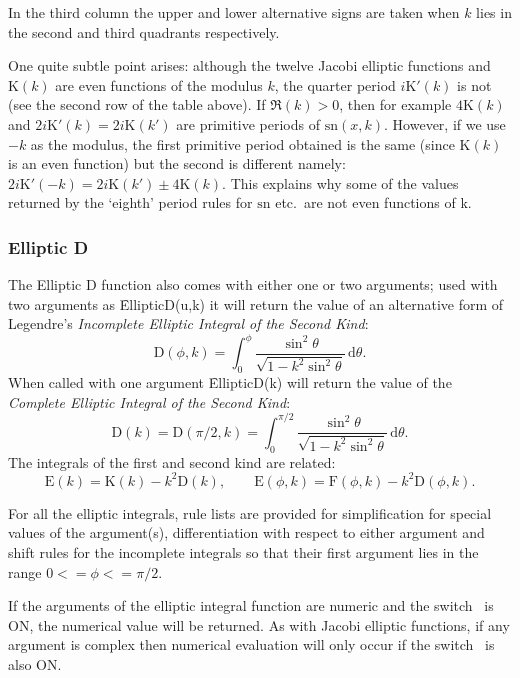 In the third column the upper and lower alternative signs are taken when
$k$ lies in the second and third quadrants respectively.

One quite subtle point arises: although the twelve Jacobi elliptic functions
and $\mathrm{K}(k)$ are even functions of the modulus $k$, the quarter period
$i\mathrm{K}'(k)$ is not (see the second row of the table above).
If $\Re(k)>0$, then for example
$4\mathrm{K}(k)$ and  $2i\mathrm{K}'(k)=2i\mathrm{K}(k')$ are
primitive periods of $\mathrm{sn}(x,k)$. However, if we use $-k$ as the modulus,
the first primitive period obtained is the same (since $\mathrm{K}(k)$ is an
even function) but the second is different namely:
$2i\mathrm{K}'(-k)=2i\mathrm{K}(k') \pm 4\mathrm{K}(k)$.
This explains why some of the values returned by the `eighth' period rules for
$\mathrm{sn}$ etc.\ are not even functions of k.

\subsubsection{Elliptic D}
\hypertarget{operator:ELLIPTICD}{}

The Elliptic D function also comes with either one or two arguments;
used with two arguments as \f{EllipticD(u,k)}
it will return the value of an alternative form of Legendre's
\emph{Incomplete Elliptic Integral of the Second Kind}:
\[\mathrm{D}(\phi, k)=\int_0^\phi\frac{\sin^2 \theta}{\sqrt{1-k^2\sin^2\theta}}
\,\mathrm{d}\theta.\]
When called with one argument \f{EllipticD(k)} will return the value of the
\emph{Complete Elliptic Integral of the Second Kind}:
\[\mathrm{D}(k)=\mathrm{D}(\pi/2, k) =
\int_0^{\pi/2} \frac{\sin^2 \theta}{\sqrt{1-k^2 \sin^2 \theta}} \,\mathrm{d}\theta.\]
The integrals of the first and second kind are related:
\[\mathrm{E}(k) = \mathrm{K}(k)-k^2\mathrm{D}(k), \qquad
\mathrm{E}(\phi, k) = \mathrm{F}(\phi, k)-k^2\mathrm{D}(\phi, k).\]

For all the elliptic integrals, rule lists are provided for simplification for
special values of the argument(s), differentiation with respect to either
argument and shift rules for the incomplete integrals so that their first
argument lies in the range  $0 <= \phi <= \pi/2$.

If the arguments of the elliptic integral function are numeric and the switch
\ is ON, the numerical value will be returned. As with Jacobi
elliptic functions, if any argument is complex then numerical evaluation will
only occur if the switch \ is also ON.

